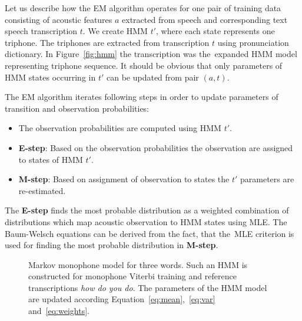 {
Let us describe how the \ac{EM} algorithm operates for one pair
of training data consisting of acoustic features $a$ extracted from speech
and corresponding text speech transcription $t$.
We create \ac{HMM} $t'$, where each state represents one triphone. 
The triphones are extracted from transcription $t$ using pronunciation dictionary.
In Figure~\ref{fig:hmm} the transcription  
was the~expanded \ac{HMM} model representing triphone sequence.
It should be obvious that only parameters of HMM states 
occurring in $t'$ can be updated from pair $(a, t)$.

The \ac{EM} algorithm iterates following steps in order 
to update parameters of transition and observation probabilities:
\begin{itemize}
    \item The observation probabilities are computed using \ac{HMM} $t'$. 
    \item {\bf E-step}: Based on the observation probabilities the observation are assigned to states of \ac{HMM} $t'$. 
    \item {\bf M-step}: Based on assignment of observation to states the $t'$ parameters are re-estimated. 
\end{itemize}

The {\bf E-step} finds the most probable distribution as a weighted combination of distributions which map acoustic observation to \ac{HMM} states using \ac{MLE}\cite{gopinath1998maximum}.
The Baum-Welsch equations can be derived from the fact, that the~\ac{MLE} criterion is used for finding the most probable distribution in {\bf M-step}.\cite{huang2001spoken}

\begin{figure}[!htp]
    \begin{center}
    
    \caption{Markov monophone model for three words. Such an \ac{HMM} is constructed for monophone Viterbi training and reference transcriptions \textit{how do you do}. The parameters of the \ac{HMM} model are updated according Equation~\ref{eq:mean},~\ref{eq:var} and~\ref{eq:weights}.}
    \label{fig:hmm_words} 
    \end{center}
\end{figure}

}
